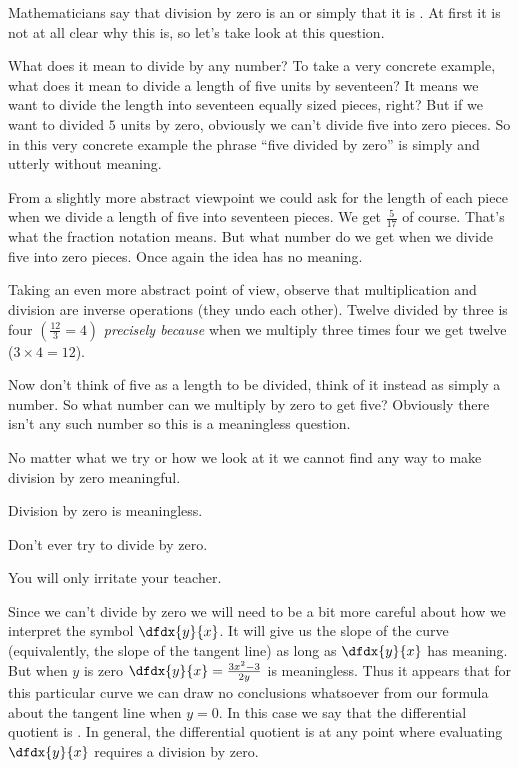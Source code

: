 \begin{Digression}
  Mathematicians say that division by zero is an  or simply that it is . At first it is
  not at all clear why this is, so let's take look at this
  question.

  What does it mean to divide by any number? To take a very concrete
  example, what does it mean to divide a length of five
  units by seventeen? It means we want to
  divide the length into seventeen equally sized pieces, right?  But
  if we want to divided $5$ units by zero, obviously we can't divide
  five into zero pieces. So in this very concrete example the phrase
  ``five divided by zero'' is simply and utterly without meaning.

  From a slightly more abstract viewpoint we could ask for the length
  of each piece when we divide a length of five into seventeen pieces.
  We get $\frac{5}{17}$ of course. That's what the fraction notation
  means. But what number do we get when we divide
  five into zero pieces. Once again the idea has no meaning.

  Taking an even more abstract point of view,  observe that multiplication and division are inverse
  operations (they undo each other). Twelve divided by three is four
  $\left(\frac{12}{3}=4\right)$ \emph{precisely because} when we
  multiply three times four we get twelve ($3\times 4 =12$).

  Now don't think of five as a length to be divided, think of it
  instead as simply a number. So what number can we multiply
  by zero to get five? Obviously there isn't any such number so this
  is a meaningless question.

  No matter what we try or how we look at it we cannot find any
  way to make  division by zero meaningful.
  

  \centerline{\alert{Division by zero is meaningless.}}
  \centerline{\alert{Don't ever try to divide by zero.}}
  \centerline{\alert{You will only irritate your
      teacher.}}
\end{Digression}

Since we can't divide by zero we will need to be a bit more careful
about how we interpret the symbol $\dfdx{y}{x}$. It will give us the
slope of the curve (equivalently, the slope of the tangent line) as
long as $\dfdx{y}{x}$ has meaning. But when $y$ is zero
$\dfdx{y}{x}=\frac{3x^2-3}{2y}$ is meaningless.  Thus it appears that
for this particular curve we can draw no conclusions whatsoever from
our formula about the tangent line when $y=0$. In this case we say
that the differential quotient is . In general, the
differential quotient is  at any point where
evaluating $\dfdx{y}{x}$ requires a division by zero.

